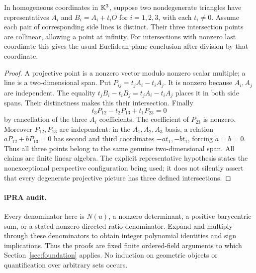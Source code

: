 \begin{theorem}\label{aff:desargues}
In homogeneous coordinates in $\mathbb K^3$, suppose two nondegenerate triangles
have representatives $A_i$ and $B_i=A_i+t_iO$ for $i=1,2,3$, with
each $t_i\ne0$. Assume each pair of corresponding side lines is distinct.
Their three intersection points are collinear, allowing a point at infinity.
For intersections with nonzero last coordinate this gives the usual
Euclidean-plane conclusion after division by that coordinate.
\end{theorem}
\begin{proof}
A projective point is a nonzero vector modulo nonzero scalar multiple;
a line is a two-dimensional span. Put
$P_{ij}=t_jA_i-t_iA_j$. It is nonzero because $A_i,A_j$ are independent.
The equality
$t_jB_i-t_iB_j=t_jA_i-t_iA_j$ places it in both side spans. Their
distinctness makes this their intersection. Finally
\[
 t_3P_{12}-t_2P_{13}+t_1P_{23}=0
\]
by cancellation of the three $A_i$ coefficients. The coefficient of
$P_{23}$ is nonzero. Moreover $P_{12},P_{13}$ are independent: in the
$A_1,A_2,A_3$ basis, a relation $aP_{12}+bP_{13}=0$ has second and
third coordinates $-at_1,-bt_1$, forcing $a=b=0$. Thus all three
points belong to the same genuine two-dimensional span.
All claims are finite linear algebra. The explicit representative
hypothesis states the nonexceptional perspective configuration being used;
it does not silently assert that every degenerate projective picture has
three defined intersections.
\end{proof}

\paragraph{iPRA audit.}
Every denominator here is $N(u)$, a nonzero determinant, a positive
barycentric sum, or a stated nonzero directed ratio denominator. Expand
and multiply through these denominators to obtain integer polynomial
identities and sign implications. Thus the proofs are fixed finite
ordered-field arguments to which Section~\ref{sec:foundation} applies.
No induction on geometric objects or quantification over arbitrary sets
occurs.

